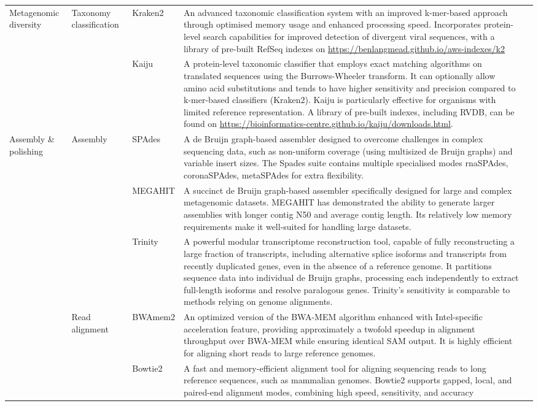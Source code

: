 \begin{longtable}{p{2cm}p{1.8cm}p{1.8cm}p{8.3cm}p{1cm}}
Metagenomic diversity & Taxonomy classification & Kraken2 & An advanced taxonomic classification system with an improved k-mer-based approach through optimised memory usage and enhanced processing speed. Incorporates protein-level search capabilities for improved detection of divergent viral sequences, with a library of pre-built RefSeq indexes on \url{https://benlangmead.github.io/aws-indexes/k2} & \citep{Wood2019-jl} \\
\cmidrule{3-5}
 & & Kaiju & A protein-level taxonomic classifier that employs exact matching algorithms on translated sequences using the Burrows-Wheeler transform. It can optionally allow amino acid substitutions and tends to have higher sensitivity and precision compared to k-mer-based classifiers (Kraken2). Kaiju is particularly effective for organisms with limited reference representation. A library of pre-built indexes, including RVDB, can be found on \url{https://bioinformatics-centre.github.io/kaiju/downloads.html}. & \citep{Menzel2016-tz} \\
\midrule

Assembly \& polishing & Assembly & SPAdes & A de Bruijn graph-based assembler designed to overcome challenges in complex sequencing data, such as non-uniform coverage (using multisized de Bruijn graphs) and variable insert sizes. The Spades suite contains multiple specialised modes rnaSPAdes, coronaSPAdes, metaSPAdes for extra flexibility. & \citep{Meleshko2021-gb} \\
\cmidrule{3-5}
 & & MEGAHIT & A succinct de Bruijn graph-based assembler specifically designed for large and complex metagenomic datasets. MEGAHIT has demonstrated the ability to generate larger assemblies with longer contig N50 and average contig length. Its relatively low memory requirements make it well-suited for handling large datasets. & \citep{Li2016-sd} \\
\cmidrule{3-5}
 & & Trinity & A powerful modular transcriptome reconstruction tool, capable of fully reconstructing a large fraction of transcripts, including alternative splice isoforms and transcripts from recently duplicated genes, even in the absence of a reference genome. It partitions sequence data into individual de Bruijn graphs, processing each independently to extract full-length isoforms and resolve paralogous genes. Trinity's sensitivity is comparable to methods relying on genome alignments. & \citep{Grabherr2011-ef} \\
\cmidrule{2-5}
 & Read alignment & BWAmem2 & An optimized version of the BWA-MEM algorithm enhanced with Intel-specific acceleration feature, providing approximately a twofold speedup in alignment throughput over BWA-MEM while ensuring identical SAM output. It is highly efficient for aligning short reads to large reference genomes. & \citep{Vasimuddin2019-rb} \\
\cmidrule{3-5}
 & & Bowtie2 & A fast and memory-efficient alignment tool for aligning sequencing reads to long reference sequences, such as mammalian genomes. Bowtie2 supports gapped, local, and paired-end alignment modes, combining high speed, sensitivity, and accuracy & \citep{Langmead2019-wx} \\
\midrule


\end{longtable}

